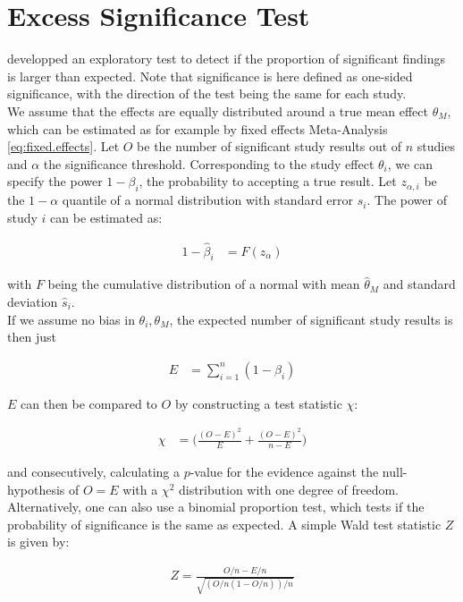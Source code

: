 \documentclass[11pt,a4paper,twoside]{book}\usepackage[]{graphicx}\usepackage[]{color}
\begin{document}
\section{Excess Significance Test}
\citet{excess.significance} developped an exploratory test to detect if the proportion of significant findings is larger than expected. Note that significance is here defined as one-sided significance, with the direction of the test being the same for each study. \\
We assume that the effects are equally distributed around a true mean effect $\theta_M$, which can be estimated as for example by fixed effects Meta-Analysis \ref{eq:fixed.effects}. Let $O$ be the number of significant study results out of $n$ studies and $\alpha$ the significance threshold. Corresponding to the study effect $\theta_i$, we can specify the power $1 - \beta_i$, the probability to accepting a true result. Let $z_{\alpha,i}$ be the $1-\alpha$ quantile of a normal distribution with standard error $\hat{s}_i$. The power of study $i$ can be estimated as:

\begin{align}
1 - \hat{\beta}_i &= F(z_\alpha) 
\end{align}

with $F$ being the cumulative distribution of a normal with mean $\hat{\theta}_M$ and standard deviation $\hat{s}_i$. \\
If we assume no bias in $\theta_i, \theta_M$, the expected number of significant study results is then just

\begin{align}
E &= \sum_{i = 1}^n (1 - \beta_i) \nonumber
\end{align}

$E$ can then be compared to $O$ by constructing a test statistic $\chi$:

\begin{align}
\chi  &= \big( \frac{(O - E)^2}{E} + \frac{(O - E)^2}{n - E}\big) \nonumber
\end{align}

and consecutively, calculating a $p$-value for the evidence against the null-hypothesis of $O = E$ with a $\chi^2$ distribution with one degree of freedom. Alternatively, one can also use a binomial proportion test, which tests if the probability of significance is the same as expected. A simple Wald test statistic $Z$ is given by:

\begin{align}
Z = \frac{O/n - E/n}{\sqrt{(O/n(1-O/n))/n}}
\end{align}
\end{document}
